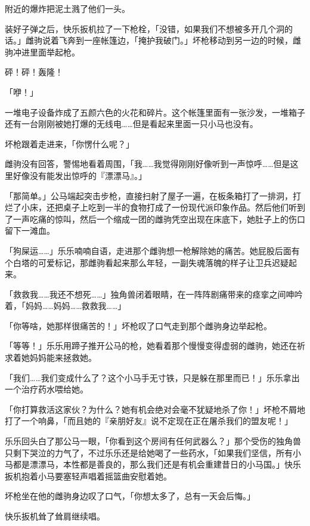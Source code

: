 附近的爆炸把泥土溅了他们一头。

装好子弹之后，快乐扳机拉了一下枪栓，「没错，如果我们不想被多开几个洞的话。」雌驹说着飞奔到一座帐篷边，「掩护我破门。」坏枪移动到另一边的时候，雌驹冲进里面举起枪。

砰！砰！轰隆！

「咿！」

一堆电子设备炸成了五颜六色的火花和碎片。这个帐篷里面有一张沙发，一堆箱子还有一台刚刚被她打爆的无线电……但是看起来里面一只小马也没有。


坏枪跟着走进来，「你愣什么呢？」

雌驹没有回答，警惕地看着周围，「我……我觉得刚刚好像听到一声惊呼……但是这里好像没有能发出惊呼的『漂漂马』。」

「那简单。」公马端起突击步枪，直接扫射了屋子一遍，在板条箱打了一排洞，打烂了小床，还把桌子上吃到一半的食物打成了一份现代派印象作品。然后他们听到了一声吃痛的惊叫，然后一个缩成一团的雌驹凭空出现在床底下，她肚子上的伤口留下一滩血。

「狗屎运……」乐乐喃喃自语，走进那个雌驹想一枪解除她的痛苦。她屁股后面有个白塔的可爱标记，那雌驹看起来那么年轻，一副失魂落魄的样子让卫兵迟疑起来。

「救救我……我还不想死……」独角兽闭着眼睛，在一阵阵剧痛带来的痉挛之间呻吟着，「妈妈……妈妈……救救我……」

「你等啥，她那样很痛苦的！」坏枪叹了口气走到那个雌驹身边举起枪。

「等等！」乐乐用蹄子推开公马的枪，她看着那个慢慢变得虚弱的雌驹，她还在祈求着她妈妈能来拯救她。

「我们……我们变成什么了？这个小马手无寸铁，只是躲在那里而已！」乐乐拿出一个治疗药水喂给她。

「你打算救活这家伙？为什么？她有机会绝对会毫不犹疑地杀了你！」坏枪不屑地打了一个响鼻，「而且她的『亲朋好友』说不定现在正在屠杀我们的盟友呢！」

乐乐回头白了那公马一眼，「你看到这个房间有任何武器么？」那个受伤的独角兽只剩下哭泣的力气了，不过乐乐还是给她喝了一些药水，「如果我们坚信，所有小马都是漂漂马，本性都是善良的，那么我们还是有机会重建昔日的小马国。」快乐扳机抱着小马要塞轻声唱着摇篮曲安慰着她。

坏枪坐在他的雌驹身边叹了口气，「你想太多了，总有一天会后悔。」

快乐扳机耸了耸肩继续唱。

\horizonline


